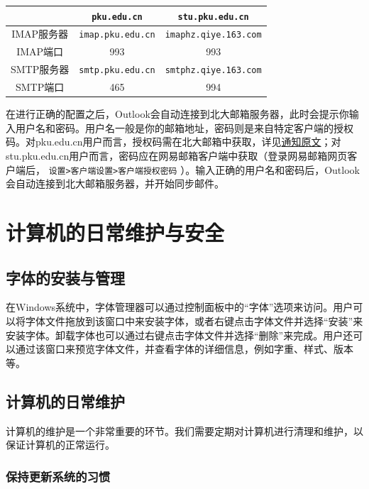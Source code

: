 \begin{table}[ht]
  \centering
  \begin{tabular}{c|c|c}
    \hline
    &  \texttt{pku.edu.cn}  &  \texttt{stu.pku.edu.cn}  \\
    \hline
    IMAP服务器 &  \texttt{imap.pku.edu.cn}  &  \texttt{imaphz.qiye.163.com}  \\
    IMAP端口 & 993 & 993 \\
    \hline
    SMTP服务器 &  \texttt{smtp.pku.edu.cn}  &  \texttt{smtphz.qiye.163.com}  \\
    SMTP端口 & 465 & 994 \\
    \hline
  \end{tabular}
\end{table}

在进行正确的配置之后，Outlook会自动连接到北大邮箱服务器，此时会提示你输入用户名和密码。用户名一般是你的邮箱地址，密码则是来自特定客户端的授权码。对pku.edu.cn用户而言，授权码需在北大邮箱中获取，详见\href{https://its.pku.edu.cn/announce/tz20250702100126.jsp}{通知原文}；对stu.pku.edu.cn用户而言，密码应在网易邮箱客户端中获取（登录网易邮箱网页客户端后， \texttt{设置>客户端设置>客户端授权密码} ）。输入正确的用户名和密码后，Outlook会自动连接到北大邮箱服务器，并开始同步邮件。

\section{计算机的日常维护与安全}

\subsection{字体的安装与管理}

在Windows系统中，字体管理器可以通过控制面板中的“字体”选项来访问。用户可以将字体文件拖放到该窗口中来安装字体，或者右键点击字体文件并选择“安装”来安装字体。卸载字体也可以通过右键点击字体文件并选择“删除”来完成。用户还可以通过该窗口来预览字体文件，并查看字体的详细信息，例如字重、样式、版本等。

\subsection{计算机的日常维护}

计算机的维护是一个非常重要的环节。我们需要定期对计算机进行清理和维护，以保证计算机的正常运行。

\subsubsection{保持更新系统的习惯}

